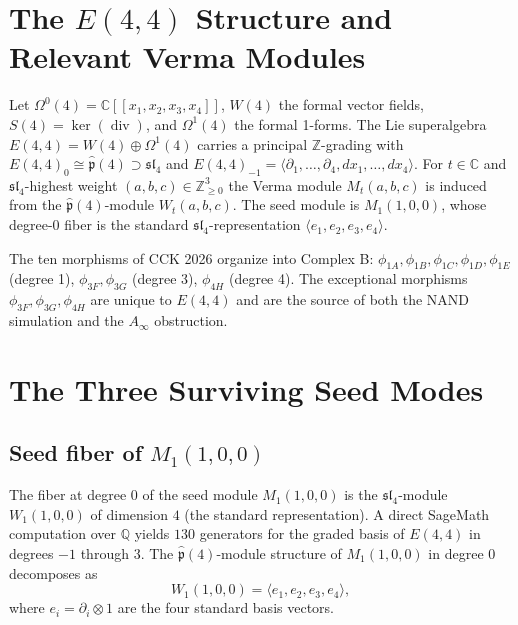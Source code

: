 \documentclass[reqno,10pt]{amsart}
\theoremstyle{plain}
\theoremstyle{definition}
\def\CC{{\mathbb{C}}}
\def\ZZ{{\mathbb{Z}}}\def\QQ{{\mathbb{Q}}}\def\NN{{\mathbb{N}}}
\def\phat{\hat{\mathfrak{p}}}
\def\slN{{\mathfrak{sl}}_4}
\def\gE{E(4,4)}
\def\div{\operatorname{div}}
\begin{document}
\section{The $E(4,4)$ Structure and Relevant Verma Modules}\label{sec:e44}

Let $\Omega^0(4) = \CC[[x_1,x_2,x_3,x_4]]$, $W(4)$ the formal vector fields,
$S(4) = \ker(\div)$, and $\Omega^1(4)$ the formal 1-forms.
The Lie superalgebra $\gE = W(4) \oplus \Omega^1(4)$ carries a principal
$\ZZ$-grading with $\gE_0 \cong \phat(4) \supset \slN$ and
$\gE_{-1} = \langle\partial_1,\ldots,\partial_4, dx_1,\ldots,dx_4\rangle$.
For $t \in \CC$ and $\slN$-highest weight $(a,b,c) \in \ZZ_{\geq 0}^3$
the Verma module $M_t(a,b,c)$ is induced from the $\phat(4)$-module
$W_t(a,b,c)$.  The seed module is $M_1(1,0,0)$, whose degree-0 fiber
is the standard $\slN$-representation $\langle e_1,e_2,e_3,e_4\rangle$.

The ten morphisms of CCK 2026 organize into Complex B:
$\phi_{1A},\phi_{1B},\phi_{1C},\phi_{1D},\phi_{1E}$ (degree 1),
$\phi_{3F},\phi_{3G}$ (degree 3), $\phi_{4H}$ (degree 4).
The exceptional morphisms $\phi_{3F},\phi_{3G},\phi_{4H}$ are unique to $\gE$
and are the source of both the NAND simulation and the $A_\infty$ obstruction.

\section{The Three Surviving Seed Modes}\label{sec:seeds}

\subsection{Seed fiber of $M_1(1,0,0)$}

The fiber at degree $0$ of the seed module $M_1(1,0,0)$ is the
$\slN$-module $W_1(1,0,0)$ of dimension $4$ (the standard representation).
A direct SageMath computation over $\QQ$ \cite{e44structure} yields $130$
generators for the graded basis of $\gE$ in degrees $-1$ through $3$.
The $\phat(4)$-module structure of $M_1(1,0,0)$ in degree $0$ decomposes as
\[
  W_1(1,0,0) = \langle e_1, e_2, e_3, e_4 \rangle,
\]
where $e_i = \partial_i \otimes 1$ are the four standard basis vectors.
\end{document}
